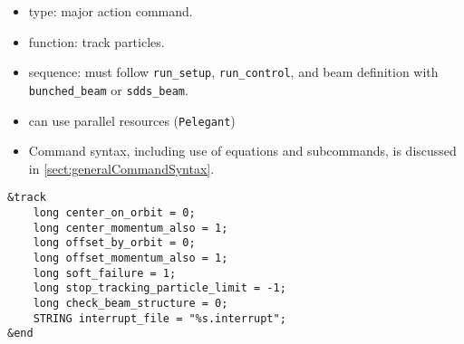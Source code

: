 \documentclass[11pt]{article}
\begin{document}
\begin{itemize}
\item type: major action command.
\item function: track particles.
\item sequence: must follow \verb|run_setup|, \verb|run_control|, and beam definition with \verb|bunched_beam| or \verb|sdds_beam|.
\item can use parallel resources (\verb|Pelegant|)
\item Command syntax, including use of equations and subcommands, is discussed in \ref{sect:generalCommandSyntax}.
\end{itemize}

\begin{verbatim}
&track
    long center_on_orbit = 0;
    long center_momentum_also = 1;
    long offset_by_orbit = 0;
    long offset_momentum_also = 1;
    long soft_failure = 1;
    long stop_tracking_particle_limit = -1;
    long check_beam_structure = 0;
    STRING interrupt_file = "%s.interrupt";
&end
\end{verbatim}
\end{document}
